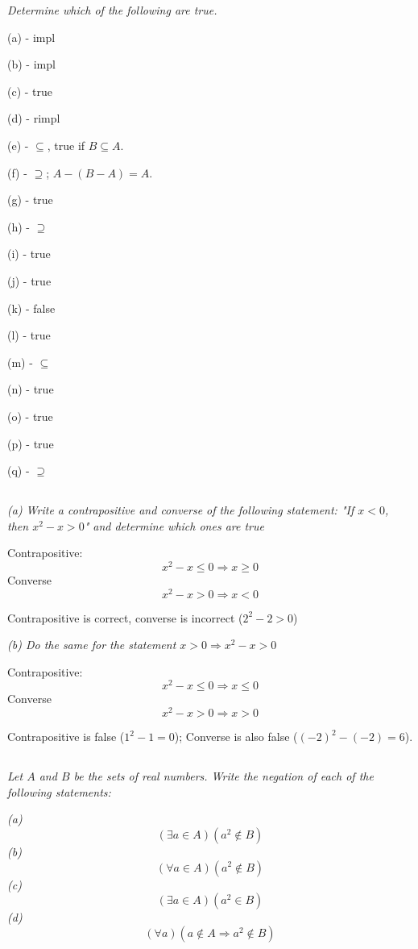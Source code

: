 \documentclass[11pt,oneside,titlepage]{book}
\DeclareMathOperator \ra {\Rightarrow}
\begin{document}
\textit{Determine which of the following are true.}

(a) - impl

(b) - impl

(c) - true

(d) - rimpl

(e) - $\subseteq$, true if $B \subseteq A$.

(f) - $\supseteq$;   $A - (B - A) = A$.

(g) - true

(h) - $\supseteq$

(i) - true

(j) - true

(k) - false

(l) - true

(m) - $\subseteq$

(n) - true

(o) - true

(p) - true

(q) - $\supseteq$

\subsection{}

\textit{(a) Write a contrapositive and converse of the following statement:
  "If $x < 0$, then $x^2 - x > 0$" and determine which ones are true}

Contrapositive:
$$x^2 - x \leq 0 \ra x \geq 0$$
Converse
$$x^2 - x > 0 \ra x < 0$$

Contrapositive is correct, converse is incorrect ($2^2 - 2 > 0$)

\textit{(b) Do the same for the statement $x > 0 \ra x^2 - x > 0$}

Contrapositive:
$$x^2 - x \leq 0 \ra x \leq 0$$
Converse
$$ x^2 - x > 0 \ra x > 0 $$

Contrapositive is false ($1^2 - 1 = 0$); Converse is also false ($(-2)^2 - (-2) = 6$).

\subsection{}

\textit{Let $A$ and $B$ be the sets of real numbers. Write the negation of each of the
  following statements: }

\textit{(a)}
$$ (\exists a \in A)(a^2 \notin B)$$
\textit{(b)}
$$ (\forall a \in A)(a^2 \notin B)$$
\textit{(c)}
$$ (\exists a \in A)(a^2 \in B)$$
\textit{(d) }
$$ (\forall a)(a \notin A \ra a^2 \notin B)$$
\end{document}

